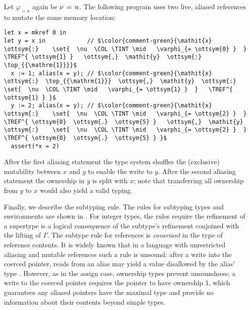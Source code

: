 \begin{example}
  \label{exmp:shuffle-example}
  Let $ \varphi_{= n } $ again be $\nu \, = \, n$.
  The following program uses two live, aliased references to mutate the same memory location:
\begin{lstlisting}
let x = mkref 0 in
let y = x in            // $\color{comment-green}{\mathit{x}  \ottsym{:}    \set{  \nu  \COL \TINT \mid   \varphi_{= \ottsym{0} }  }   \TREF^{ \ottsym{1} }   \ottsym{,}  \mathit{y}  \ottsym{:}  \top_{{\mathrm{1}}}}$
  x := 1; alias(x = y); // $\color{comment-green}{\mathit{x}  \ottsym{:}  \top_{{\mathrm{1}}}  \ottsym{,}  \mathit{y}  \ottsym{:}    \set{  \nu  \COL \TINT \mid   \varphi_{= \ottsym{1} }  }   \TREF^{ \ottsym{1} } }$
  y := 2; alias(x = y); // $\color{comment-green}{\mathit{x}  \ottsym{:}    \set{  \nu  \COL \TINT \mid   \varphi_{= \ottsym{2} }  }   \TREF^{ \ottsym{0}  \ottsym{.}  \ottsym{5} }   \ottsym{,}  \mathit{y}  \ottsym{:}    \set{  \nu  \COL \TINT \mid   \varphi_{= \ottsym{2} }  }   \TREF^{ \ottsym{0}  \ottsym{.}  \ottsym{5} } }$
  assert(*x = 2)
\end{lstlisting}
  After the first aliasing
  statement the type system shuffles the (exclusive) mutability between $\mathit{x}$
  and $\mathit{y}$ to enable the write to $\mathit{y}$. After the second aliasing statement
  the ownership in $\mathit{y}$ is split with $\mathit{x}$; note that
  transferring all ownership from $\mathit{y}$ to $\mathit{x}$ would also yield a
  valid typing.
\end{example}

Finally, we describe the subtyping rule. The rules for subtyping types
and environments are shown in . For integer types,
the rules require the refinement of a supertype is a logical consequence of
the subtype's refinement conjoined with the lifting of $\Gamma$.
The subtype rule for references is \emph{covariant} in the type
of reference contents. It is widely known that in a language with unrestricted aliasing
and mutable references such a rule is unsound: after a write into the coerced
pointer, reads from an alias may yield a value disallowed by the alias' type
\cite{pierce2002types}. However, as in
the assign case, ownership types prevent unsoundness; a write to the
coerced pointer requires the pointer to have ownership 1, which guarantees
any aliased pointers have the maximal type and provide no information about their contents
beyond simple types.


